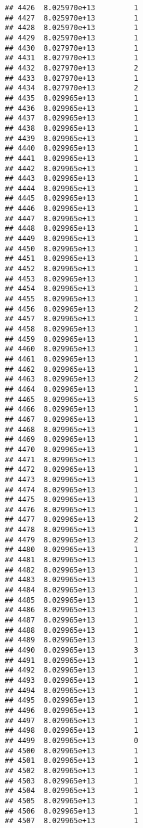 \documentclass[
]{article}
\begin{document}
\begin{verbatim}
## 4426  8.025970e+13         1
## 4427  8.025970e+13         1
## 4428  8.025970e+13         1
## 4429  8.025970e+13         1
## 4430  8.027970e+13         1
## 4431  8.027970e+13         1
## 4432  8.027970e+13         2
## 4433  8.027970e+13         1
## 4434  8.027970e+13         2
## 4435  8.029965e+13         1
## 4436  8.029965e+13         1
## 4437  8.029965e+13         1
## 4438  8.029965e+13         1
## 4439  8.029965e+13         1
## 4440  8.029965e+13         1
## 4441  8.029965e+13         1
## 4442  8.029965e+13         1
## 4443  8.029965e+13         1
## 4444  8.029965e+13         1
## 4445  8.029965e+13         1
## 4446  8.029965e+13         1
## 4447  8.029965e+13         1
## 4448  8.029965e+13         1
## 4449  8.029965e+13         1
## 4450  8.029965e+13         1
## 4451  8.029965e+13         1
## 4452  8.029965e+13         1
## 4453  8.029965e+13         1
## 4454  8.029965e+13         1
## 4455  8.029965e+13         1
## 4456  8.029965e+13         2
## 4457  8.029965e+13         1
## 4458  8.029965e+13         1
## 4459  8.029965e+13         1
## 4460  8.029965e+13         1
## 4461  8.029965e+13         1
## 4462  8.029965e+13         1
## 4463  8.029965e+13         2
## 4464  8.029965e+13         1
## 4465  8.029965e+13         5
## 4466  8.029965e+13         1
## 4467  8.029965e+13         1
## 4468  8.029965e+13         1
## 4469  8.029965e+13         1
## 4470  8.029965e+13         1
## 4471  8.029965e+13         1
## 4472  8.029965e+13         1
## 4473  8.029965e+13         1
## 4474  8.029965e+13         1
## 4475  8.029965e+13         1
## 4476  8.029965e+13         1
## 4477  8.029965e+13         2
## 4478  8.029965e+13         1
## 4479  8.029965e+13         2
## 4480  8.029965e+13         1
## 4481  8.029965e+13         1
## 4482  8.029965e+13         1
## 4483  8.029965e+13         1
## 4484  8.029965e+13         1
## 4485  8.029965e+13         1
## 4486  8.029965e+13         1
## 4487  8.029965e+13         1
## 4488  8.029965e+13         1
## 4489  8.029965e+13         1
## 4490  8.029965e+13         3
## 4491  8.029965e+13         1
## 4492  8.029965e+13         1
## 4493  8.029965e+13         1
## 4494  8.029965e+13         1
## 4495  8.029965e+13         1
## 4496  8.029965e+13         1
## 4497  8.029965e+13         1
## 4498  8.029965e+13         1
## 4499  8.029965e+13         0
## 4500  8.029965e+13         1
## 4501  8.029965e+13         1
## 4502  8.029965e+13         1
## 4503  8.029965e+13         1
## 4504  8.029965e+13         1
## 4505  8.029965e+13         1
## 4506  8.029965e+13         1
## 4507  8.029965e+13         1

\end{verbatim}
\end{document}
